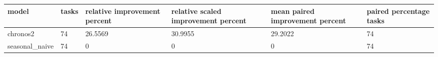 \begin{tabular}{llllll}
\toprule
model & tasks & relative improvement percent & relative scaled improvement percent & mean paired improvement percent & paired percentage tasks \\
\midrule
chronos2 & 74 & 26.5569 & 30.9955 & 29.2022 & 74 \\
seasonal\_naive & 74 & 0 & 0 & 0 & 74 \\
\bottomrule
\end{tabular}
